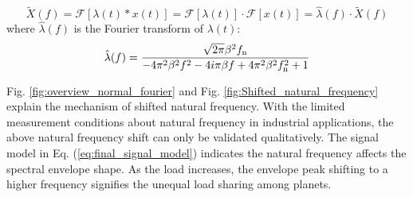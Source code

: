 \documentclass[a4paper,fleqn]{cas-sc}%
\begin{document}
\begin{equation}
        \widetilde{X}(f)= \mathcal{F}\left[\lambda(t) \ast x(t) \right]
                    = \mathcal{F}\left[\lambda(t)\right] \cdot \mathcal{F}\left[x(t)\right]
                    = \hat{\lambda}(f) \cdot \widetilde{X}(f)
\end{equation}
where $\hat{\lambda}(f)$ is the Fourier transform of $\lambda(t)$:
\begin{equation}
    \hat{\lambda}(f)=\frac{\sqrt{2 \pi } \beta ^2 f_{\rm n}}{-4 \pi ^2 \beta ^2 f^2-4 i \pi  \beta  f+4 \pi ^2 \beta ^2 f_{\rm n}^2+1}
\end{equation}
\par Fig. \ref{fig:overview_normal_fourier} and Fig. \ref{fig:Shifted_natural_frequency} explain the mechanism of shifted natural frequency. With the limited measurement conditions about natural frequency in industrial applications, the above natural frequency shift can only be validated qualitatively. The signal model in Eq. (\ref{eq:final_signal_model}) indicates the natural frequency affects the spectral envelope shape. As the load increases, the envelope peak shifting to a higher frequency signifies the unequal load sharing among planets.
\end{document}
